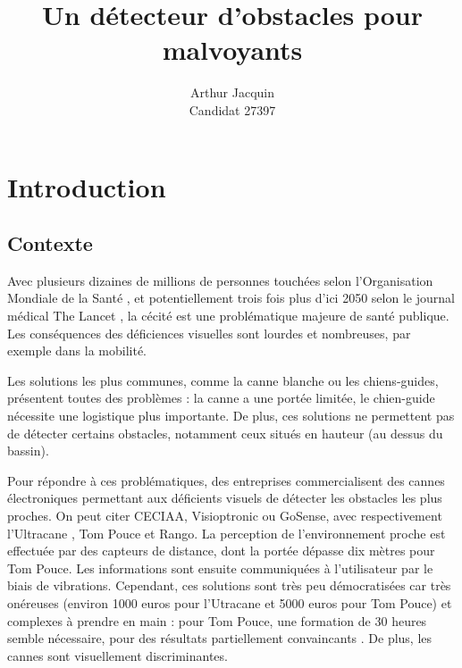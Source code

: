 \documentclass[a4paper, 11pt]{article}
\title{Un détecteur d'obstacles pour malvoyants}
\author{Arthur Jacquin\\Candidat 27397}
\date{}
\begin{document}
\maketitle
\tableofcontents
\newpage
\listoffigures
\listoftables
\printbibliography




\newpage \section{Introduction}

\subsection{Contexte}

\par Avec plusieurs dizaines de millions de personnes touchées selon l'Organisation Mondiale de la Santé \cite{oms}, et potentiellement trois fois plus d'ici 2050 selon le journal médical The Lancet \cite{thelancet}, la cécité est une problématique majeure de santé publique. Les conséquences des déficiences visuelles sont lourdes et nombreuses, par exemple dans la mobilité.

Les solutions les plus communes, comme la canne blanche ou les chiens-guides, présentent toutes des problèmes : la canne a une portée limitée, le chien-guide nécessite une logistique plus importante. De plus, ces solutions ne permettent pas de détecter certains obstacles, notamment ceux situés en hauteur (au dessus du bassin).

Pour répondre à ces problématiques, des entreprises commercialisent des cannes électroniques permettant aux déficients visuels de détecter les obstacles les plus proches. On peut citer CECIAA, Visioptronic ou GoSense, avec respectivement l'Ultracane \cite{ultracane}, Tom Pouce \cite{tompouce} et Rango. La perception de l'environnement proche est effectuée par des capteurs de distance, dont la portée dépasse dix mètres pour Tom Pouce. Les informations sont ensuite communiquées à l'utilisateur par le biais de vibrations. Cependant, ces solutions sont très peu démocratisées car très onéreuses (environ 1000 euros pour l'Utracane et 5000 euros pour Tom Pouce) et complexes à prendre en main : pour Tom Pouce, une formation de 30 heures semble nécessaire, pour des résultats partiellement convaincants \cite{formation}. De plus, les cannes sont visuellement discriminantes.
\end{document}

